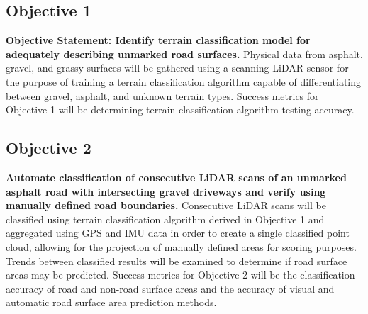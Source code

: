 \documentclass[numbered,pdftex]{ohio-etd}
\begin{document}
	\subsection{Objective 1}
	
		{\textbf{Objective Statement: Identify terrain classification model for adequately describing unmarked road surfaces.} Physical data from asphalt, gravel, and grassy surfaces will be gathered using a scanning LiDAR sensor for the purpose of training a terrain classification algorithm capable of differentiating between gravel, asphalt, and unknown terrain types. Success metrics for Objective 1 will be determining terrain classification algorithm testing accuracy.}

	\subsection{Objective 2}

		{\textbf{Automate classification of consecutive LiDAR scans of an unmarked asphalt road with intersecting gravel driveways and verify using manually defined road boundaries.} Consecutive LiDAR scans will be classified using terrain classification algorithm derived in Objective 1 and aggregated using GPS and IMU data in order to create a single classified point cloud, allowing for the projection of manually defined areas for scoring purposes. Trends between classified results will be examined to determine if road surface areas may be predicted. Success metrics for Objective 2 will be the classification accuracy of road and non-road surface areas and the accuracy of visual and automatic road surface area prediction methods.}
\end{document}
